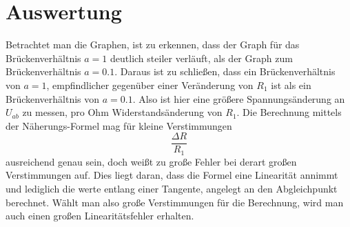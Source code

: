 \newpage

\section[Auswertung]{Auswertung}

Betrachtet man die Graphen, ist zu erkennen, dass der Graph für das Brückenverhältnis \( a = 1 \)
deutlich steiler verläuft, als der Graph zum Brückenverhältnis \( a = 0.1 \).
Daraus ist zu schließen, dass ein Brückenverhältnis von \( a = 1 \),
empfindlicher gegenüber einer Veränderung von \( R_1 \) ist als ein Brückenverhältnis von \( a = 0.1 \).
Also ist hier eine größere Spannungsänderung an \( U_{ab} \) zu messen, pro Ohm Widerstandsänderung von \( R_1 \).
Die Berechnung mittels der Näherungs-Formel mag für kleine Verstimmungen
\[ \frac{\Delta R}{R_1} \]
ausreichend genau sein,
doch weißt zu große Fehler bei derart großen Verstimmungen auf.
Dies liegt daran, dass die Formel eine Linearität annimmt und lediglich die werte entlang einer Tangente,
angelegt an den Abgleichpunkt berechnet.
Wählt man also große Verstimmungen für die Berechnung, wird man auch einen großen Linearitätsfehler erhalten.